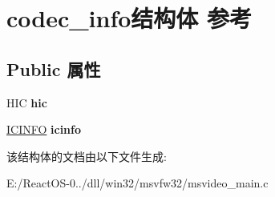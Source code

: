 \hypertarget{structcodec__info}{}\section{codec\+\_\+info结构体 参考}
\label{structcodec__info}
\subsection*{Public 属性}
\begin{DoxyCompactItemize}
\item 
\mbox{\label{structcodec__info_acb0a82b393f632571c53aacd4718480b}} 
H\+IC {\bfseries hic}
\item 
\mbox{\label{structcodec__info_ae6d15832749e4c979378161a38247faf}} 
\hyperlink{struct_i_c_i_n_f_o}{I\+C\+I\+N\+FO} {\bfseries icinfo}
\end{DoxyCompactItemize}


该结构体的文档由以下文件生成\+:\begin{DoxyCompactItemize}
\item 
E\+:/\+React\+O\+S-\/0../dll/win32/msvfw32/msvideo\+\_\+main.\+c\end{DoxyCompactItemize}
